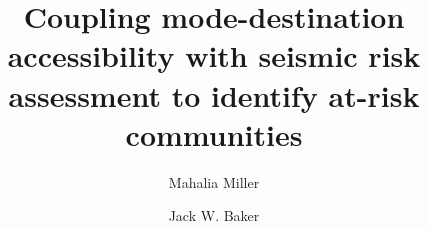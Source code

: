 \documentclass[3p,times]{elsarticle}
\begin{document}
\begin{frontmatter}


\dochead{}

\title{Coupling mode-destination accessibility with seismic risk assessment to identify at-risk communities}




 \author[label1]{Mahalia Miller}
  \author[label1]{Jack W. Baker}


\address[label1]{Department of Civil and Environmental Engineering, Stanford University, 439 Panama Mall, MC:3037, Stanford, CA 94305, United States}



\end{frontmatter}
\end{document}
